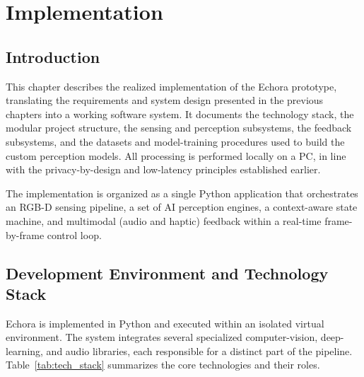 \chapter{Implementation}
\label{ch:implementation}

\section{Introduction}

This chapter describes the realized implementation of the Echora prototype, translating the requirements and system design presented in the previous chapters into a working software system. It documents the technology stack, the modular project structure, the sensing and perception subsystems, the feedback subsystems, and the datasets and model-training procedures used to build the custom perception models. All processing is performed locally on a PC, in line with the privacy-by-design and low-latency principles established earlier.

The implementation is organized as a single Python application that orchestrates an RGB-D sensing pipeline, a set of AI perception engines, a context-aware state machine, and multimodal (audio and haptic) feedback within a real-time frame-by-frame control loop.

\section{Development Environment and Technology Stack}

Echora is implemented in Python and executed within an isolated virtual environment. The system integrates several specialized computer-vision, deep-learning, and audio libraries, each responsible for a distinct part of the pipeline. Table~\ref{tab:tech_stack} summarizes the core technologies and their roles.

